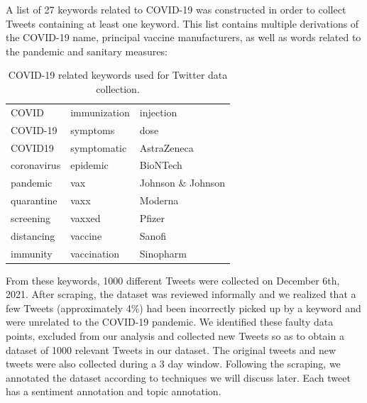 \documentclass[letterpaper]{article} %
\begin{document}



A list of 27 keywords related to COVID-19 was constructed in order to collect Tweets containing at least one keyword. This list contains multiple derivations of the COVID-19 name, principal vaccine manufacturers, as well as words related to the pandemic and sanitary measures: 

\vspace{0.1cm}

\begin{table}[htb]
\caption{COVID-19 related keywords used for Twitter data collection.}
  \centering
\begin{tabular}{|M{2cm}|M{2cm}|M{2.8cm}| }
 \hline 
 COVID & immunization & injection\\
 COVID-19 & symptoms & dose\\
 COVID19 & symptomatic & AstraZeneca\\
 coronavirus & epidemic & BioNTech\\
 pandemic & vax & Johnson \& Johnson\\
 quarantine & vaxx & Moderna\\
 screening & vaxxed & Pfizer\\
 distancing & vaccine & Sanofi\\
 immunity & vaccination & Sinopharm\\
 \hline
\end{tabular}
\end{table}

\vspace{0.1cm}


From these keywords, 1000 different Tweets were collected on December 6th, 2021. After scraping, the dataset was reviewed informally and we realized that a few Tweets (approximately 4\%) had been incorrectly picked up by a keyword and were unrelated to the COVID-19 pandemic. We identified these faulty data points, excluded from our analysis and collected new Tweets so as to obtain a dataset of 1000 relevant Tweets in our dataset. The original tweets and new tweets were also collected during a 3 day window. Following the scraping, we annotated the dataset according to techniques we will discuss later. Each tweet has a sentiment annotation and topic annotation. 
\end{document}
